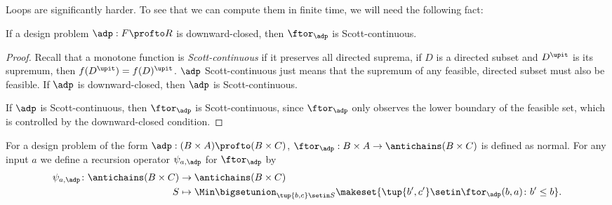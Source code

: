 Loops are significantly harder.
To see that we can compute them in finite time, we will need the following fact:
\begin{lemma}
    If a design problem $\adp : F \profto R$ is downward-closed, then $\ftor_\adp$ is Scott-continuous.
\end{lemma}

\begin{proof}
    Recall that a monotone function is \emph{Scott-continuous} if it preserves all directed suprema, \ie  if $D$ is a directed subset and $D^\upit$ is its supremum, then $f(D^\upit) = f(D)^\upit$.
    $\adp$ Scott-continuous just means that the supremum of any feasible, directed subset must also be feasible.
    If $\adp$ is downward-closed, then $\adp$ is Scott-continuous.


    If $\adp$ is Scott-continuous, then $\ftor_\adp$ is Scott-continuous, since $\ftor_\adp$ only observes the lower boundary of the feasible set, which is controlled by the downward-closed condition.
\end{proof}

For a design problem of the form $\adp : (B \times A) \profto (B \times C)$, $\ftor_\adp : B \times A \to \antichains (B \times C)$ is defined as normal.
For any input $a$ we define a recursion operator $\psi_{a,\adp}$ for $\ftor_\adp$ by
\begin{equation}
    \begin{aligned}
        \psi_{a,\adp} \colon \antichains (B \times C) & \to \antichains (B \times C) \\
        S                                             & \mapsto \Min \bigsetunion_{\tup{b,c} \setin S} \makeset{ \tup{b',c'} \setin \ftor_\adp(b,a) \colon b' \leq b }.
    \end{aligned}
\end{equation}

